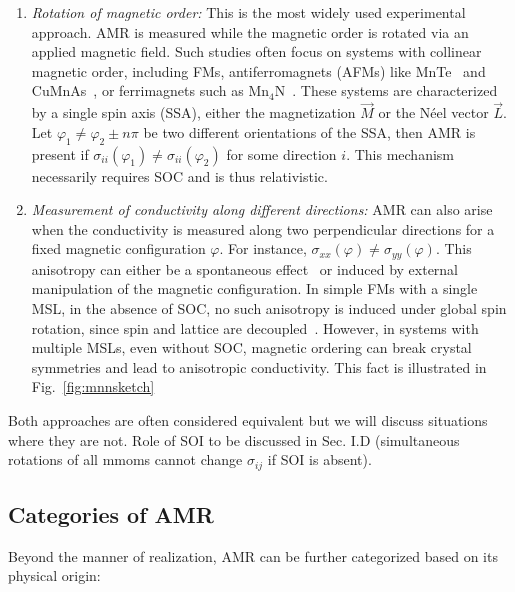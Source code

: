 \documentclass[prb,showpacs,amsmath,amssymb,superscriptaddress,twocolumn,floatfix]{revtex4-1}
\begin{document}
\begin{enumerate}
	\item \textit{Rotation of magnetic order:} This is the most widely used experimental approach. AMR is measured while the magnetic order is rotated via an applied magnetic field. Such studies often focus on systems with collinear magnetic order, including FMs, antiferromagnets (AFMs) like MnTe~\cite{Kriegner:2017, Gonzalez-Betancourt:2024} and CuMnAs~\cite{Volny:2020, Zubac:2021, Wadley:2016}, or ferrimagnets such as Mn$_4$N~\cite{Kabara:2017}. These systems are characterized by a single spin axis (SSA), either the magnetization $\vec{M}$ or the N\'eel vector $\vec{L}$. Let $\varphi_1 \neq \varphi_2 \pm n\pi$ be two different orientations of the SSA, then AMR is present if {\color{blue} $\sigma_{ii}(\varphi_1) \neq \sigma_{ii}(\varphi_2)$ for some direction $i$}. This mechanism necessarily requires SOC and is thus relativistic.
	
	\item \textit{Measurement of conductivity along different directions:} AMR can also arise when the conductivity is measured along two perpendicular directions for a fixed magnetic configuration $\varphi$. For instance, $\sigma_{xx}(\varphi) \neq \sigma_{yy}(\varphi)$. This anisotropy can either be a spontaneous effect~\cite{Bakonyi:2022} or induced by external manipulation of the magnetic configuration. In {\color{blue} simple FMs with a single MSL}, in the absence of SOC, no such anisotropy is induced under global spin rotation, since spin and lattice are decoupled~\cite{Gonzalez-Hernandez:2024}. However, in systems with multiple MSLs, even without SOC, magnetic ordering can break crystal symmetries and lead to anisotropic conductivity. This fact is illustrated in Fig.~\ref{fig:mnnsketch}
\end{enumerate}

{\color{red} Both approaches are often considered equivalent but we
  will discuss situations where they are not. Role of SOI to be
  discussed in Sec. I.D (simultaneous rotations of all mmoms cannot
  change $\sigma_{ij}$ if SOI is absent). }

\subsection{Categories of AMR}

Beyond the manner of realization, AMR can be further categorized based on its physical origin:
\end{document}
